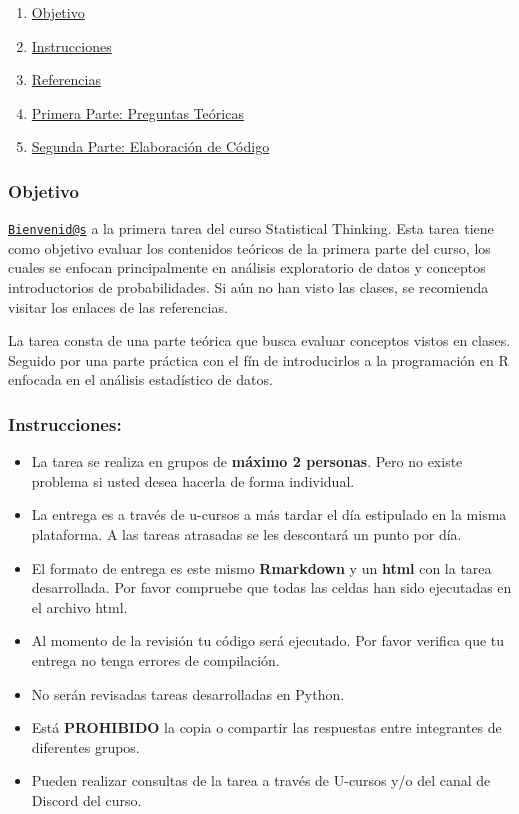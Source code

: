 \documentclass[]{article}
\providecommand{\tightlist}{%
  \setlength{\itemsep}{0pt}\setlength{\parskip}{0pt}}
\begin{document}
\begin{enumerate}
\def\labelenumi{\arabic{enumi}.}
\tightlist
\item
  \protect\hyperlink{id1}{Objetivo}
\item
  \protect\hyperlink{id2}{Instrucciones}
\item
  \protect\hyperlink{id3}{Referencias}
\item
  \protect\hyperlink{id4}{Primera Parte: Preguntas Teóricas}
\item
  \protect\hyperlink{id5}{Segunda Parte: Elaboración de Código}
\end{enumerate}

\hypertarget{objetivo}{%
\subsubsection{\texorpdfstring{\textbf{Objetivo}}{Objetivo}}\label{objetivo}}

\href{mailto:Bienvenid@s}{\nolinkurl{Bienvenid@s}} a la primera tarea
del curso Statistical Thinking. Esta tarea tiene como objetivo evaluar
los contenidos teóricos de la primera parte del curso, los cuales se
enfocan principalmente en análisis exploratorio de datos y conceptos
introductorios de probabilidades. Si aún no han visto las clases, se
recomienda visitar los enlaces de las referencias.

La tarea consta de una parte teórica que busca evaluar conceptos vistos
en clases. Seguido por una parte práctica con el fín de introducirlos a
la programación en R enfocada en el análisis estadístico de datos.

\hypertarget{instrucciones}{%
\subsubsection{\texorpdfstring{\textbf{Instrucciones:}}{Instrucciones:}}\label{instrucciones}}

\begin{itemize}
\tightlist
\item
  La tarea se realiza en grupos de \textbf{máximo 2 personas}. Pero no
  existe problema si usted desea hacerla de forma individual.
\item
  La entrega es a través de u-cursos a más tardar el día estipulado en
  la misma plataforma. A las tareas atrasadas se les descontará un punto
  por día.
\item
  El formato de entrega es este mismo \textbf{Rmarkdown} y un
  \textbf{html} con la tarea desarrollada. Por favor compruebe que todas
  las celdas han sido ejecutadas en el archivo html.
\item
  Al momento de la revisión tu código será ejecutado. Por favor verifica
  que tu entrega no tenga errores de compilación.
\item
  No serán revisadas tareas desarrolladas en Python.
\item
  Está \textbf{PROHIBIDO} la copia o compartir las respuestas entre
  integrantes de diferentes grupos.
\item
  Pueden realizar consultas de la tarea a través de U-cursos y/o del
  canal de Discord del curso.
\end{itemize}
\end{document}
